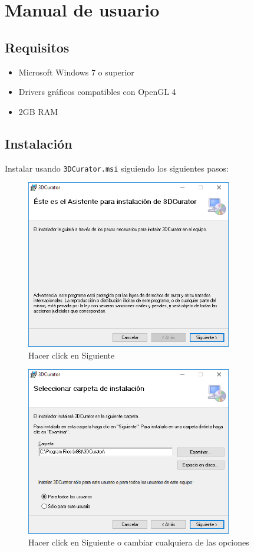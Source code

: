 \chapter{Manual de usuario}

\section{Requisitos}

\begin{itemize}
	\item Microsoft Windows 7 o superior
	\item Drivers gráficos compatibles con OpenGL 4
	\item 2GB RAM
\end{itemize}

\section{Instalación}

Instalar usando \texttt{3DCurator.msi} siguiendo los siguientes pasos:

\begin{figure}[H]
	\centering
	\includegraphics[width=9cm]{imagenes/instalacion_1}
	\caption{Hacer click en Siguiente}
	\label{fig:instalacion_1}
\end{figure}

\begin{figure}[H]
	\centering
	\includegraphics[width=9cm]{imagenes/instalacion_2}
	\caption{Hacer click en Siguiente o cambiar cualquiera de las opciones}
	\label{fig:instalacion_2}
\end{figure}

